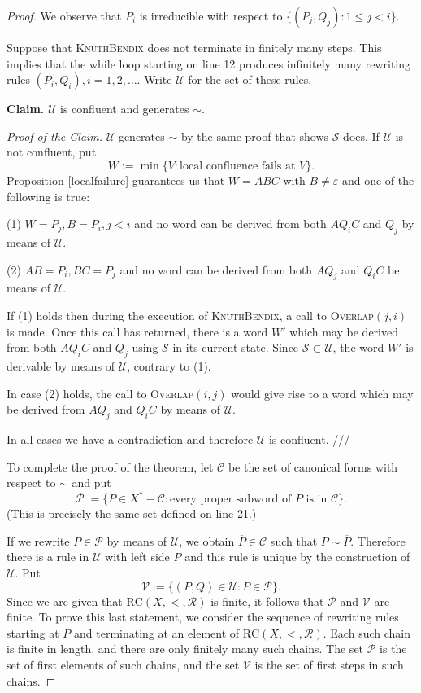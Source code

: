 \begin{ap}
\begin{proof}
    We observe that $P_i$ is irreducible with respect to $\{(P_j,Q_j) : 1 \le j
    < i\}.$

    Suppose that \textsc{KnuthBendix} does not terminate in finitely many
    steps. This implies that the while loop starting on line 12 produces
    infinitely many rewriting rules $(P_i,Q_i), i = 1,2,\dots$. Write
    $\mathcal{U}$ for the set of these rules.

    \textbf{Claim.} $\mathcal{U}$ is confluent and generates $\sim$.

    \emph{Proof of the Claim.} $\mathcal{U}$ generates $\sim$ by the same proof
    that shows $\mathcal{S}$ does. If $\mathcal{U}$ is not confluent, put \[ W
    := \min\{V : \text{local confluence fails at } V\}.\] Proposition
    \ref{localfailure} guarantees us that $W = ABC$ with $B\neq \varepsilon$
    and one of the following is true:

    (1) $W = P_j, B = P_i, j < i$ and no word can be derived from both $AQ_iC$
    and $Q_j$ by means of $\mathcal{U}$.

    (2) $AB = P_i, BC = P_j$ and no word can be derived from both $AQ_j$ and
    $Q_iC$ be means of $\mathcal{U}$.

    If (1) holds then during the execution of \textsc{KnuthBendix}, a call to
    \textsc{Overlap}$(j,i)$ is made. Once this call has returned, there is a
    word $W'$ which may be derived from both $AQ_iC$ and $Q_j$ using
    $\mathcal{S}$ in its current state. Since $\mathcal{S} \subset
    \mathcal{U}$, the word $W'$ is derivable by means of $\mathcal{U}$,
    contrary to (1).

    In case (2) holds, the call to \textsc{Overlap}$(i,j)$ would give rise to a
    word which may be derived from $AQ_j$ and $Q_iC$ by means of $\mathcal{U}$.

    In all cases we have a contradiction and therefore $\mathcal{U}$ is
    confluent. ///

    To complete the proof of the theorem, let $\mathcal{C}$ be the set of
    canonical forms with respect to $\sim$ and put \[\mathcal{P} := \{P \in X^*
    - \mathcal{C} : \text{every proper subword of } P \text{ is in }
    \mathcal{C}\}.\] (This is precisely the same set defined on line 21.)

    If we rewrite $P\in \mathcal{P}$ by means of $\mathcal{U}$, we obtain
    $\overline{P}\in \mathcal{C}$ such that $P \sim \overline{P}$. Therefore
    there is a rule in $\mathcal{U}$ with left side $P$ and this rule is unique
    by the construction of $\mathcal{U}$. Put \[\mathcal{V} := \{(P,Q)\in
    \mathcal{U} : P \in \mathcal{P}\}.\] Since we are given that
    $\mathrm{RC}(X,<,\mathcal{R})$ is finite, it follows that $\mathcal{P}$ and
    $\mathcal{V}$ are finite. To prove this last statement, we consider the
    sequence of rewriting rules starting at $P$ and terminating at an element
    of $\mathrm{RC}(X,<,\mathcal{R})$. Each such chain is finite in length, and
    there are only finitely many such chains. The set $\mathcal{P}$ is the set
    of first elements of such chains, and the set $\mathcal{V}$ is the set of
    first steps in such chains.


\end{proof}
\end{ap}
